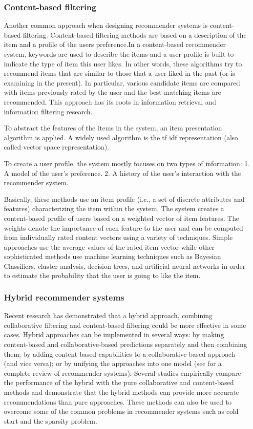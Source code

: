 \documentclass[paper=a4, fontsize=11pt]{scrartcl}
\numberwithin{equation}{section}		%
\numberwithin{figure}{section}			%
\numberwithin{table}{section}				%
\begin{document}
\subsubsection{Content-based filtering}
Another common approach when designing recommender systems is content-based filtering. Content-based filtering methods are based on a description of the item and a profile of the users preference.In a content-based recommender system, keywords are used to describe the items and a user profile is built to indicate the type of item this user likes. In other words, these algorithms try to recommend items that are similar to those that a user liked in the past (or is examining in the present). In particular, various candidate items are compared with items previously rated by the user and the best-matching items are recommended. This approach has its roots in information retrieval and information filtering research.

To abstract the features of the items in the system, an item presentation algorithm is applied. A widely used algorithm is the tf idf representation (also called vector space representation).

To create a user profile, the system mostly focuses on two types of information: 1. A model of the user's preference. 2. A history of the user's interaction with the recommender system.

Basically, these methods use an item profile (i.e., a set of discrete attributes and features) characterizing the item within the system. The system creates a content-based profile of users based on a weighted vector of item features. The weights denote the importance of each feature to the user and can be computed from individually rated content vectors using a variety of techniques. Simple approaches use the average values of the rated item vector while other sophisticated methods use machine learning techniques such as Bayesian Classifiers, cluster analysis, decision trees, and artificial neural networks in order to estimate the probability that the user is going to like the item.

\subsubsection{Hybrid recommender systems}
Recent research has demonstrated that a hybrid approach, combining collaborative filtering and content-based filtering could be more effective in some cases. Hybrid approaches can be implemented in several ways: by making content-based and collaborative-based predictions separately and then combining them; by adding content-based capabilities to a collaborative-based approach (and vice versa); or by unifying the approaches into one model (see for a complete review of recommender systems). Several studies empirically compare the performance of the hybrid with the pure collaborative and content-based methods and demonstrate that the hybrid methods can provide more accurate recommendations than pure approaches. These methods can also be used to overcome some of the common problems in recommender systems such as cold start and the sparsity problem.
\end{document}

